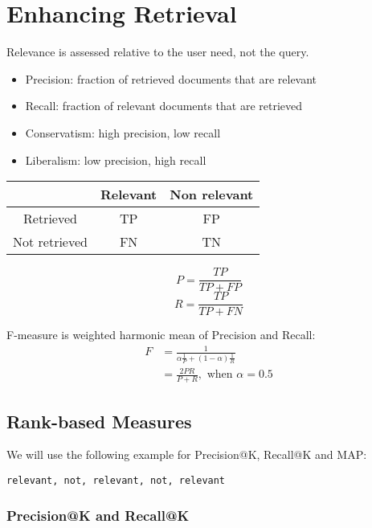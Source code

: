 \chapter{Enhancing Retrieval}

\begin{multicols*}{2}

\noindent Relevance is assessed relative to the user need, not the query.

\begin{itemize}
    \item Precision: fraction of retrieved documents that are relevant
    \item Recall: fraction of relevant documents that are retrieved
    \item Conservatism: high precision, low recall
    \item Liberalism: low precision, high recall
\end{itemize}

\begin{center}
\begin{tabular}{ |c|c c| } 
    \hline
     & Relevant & Non relevant \\
    \hline 
    Retrieved & TP & FP \\
    Not retrieved & FN & TN \\
    \hline
\end{tabular}
\end{center}

$$P=\frac{TP}{TP+FP}$$
$$R=\frac{TP}{TP+FN}$$

\noindent F-measure is weighted harmonic mean of Precision and Recall:
\begin{equation*}
\begin{split}
    F &=\frac{1}{\alpha \frac{1}{P} + (1-\alpha)\frac{1}{R}} \\
    &= \frac{2PR}{P+R}, \text{ when } \alpha = 0.5
\end{split}
\end{equation*}

\section{Rank-based Measures}
\noindent We will use the following example for Precision@K, Recall@K and MAP:

\noindent \verb|relevant, not, relevant, not, relevant|

\subsection{Precision@K and Recall@K}


\end{multicols*}
